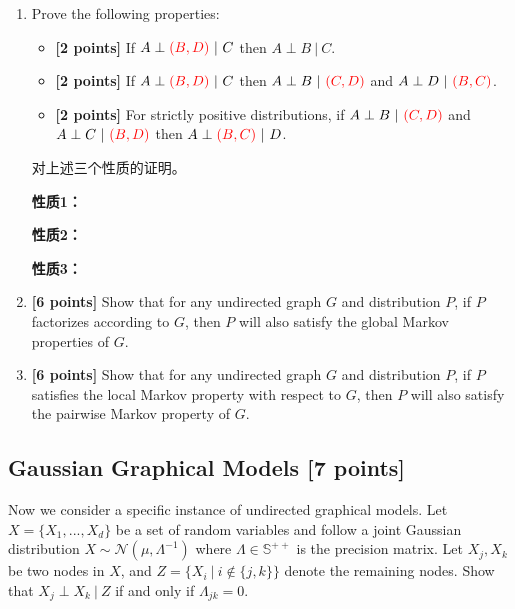 \documentclass[12pt]{article}
\begin{document}
\begin{enumerate}
	\item Prove the following properties:
	      \begin{itemize}
		      \item \textbf{[2 points]} If $A \perp {\color{red} (B,D) } \ | \ C$ then $A \perp B \ | \ C$.
		      \item \textbf{[2 points]} If $A \perp {\color{red} (B,D) } \ | \ C$ then $A \perp B \ | \ {\color{red} (C,D) }$ and $A \perp D \ | \ {\color{red} (B,C) }$.
		      \item \textbf{[2 points]} For strictly positive distributions, if $A \perp B \ | \ {\color{red} (C,D) }$ and $A \perp C \ | \ {\color{red} (B,D) }$ then $A \perp {\color{red} (B,C) } \ | \ D$.
	      \end{itemize}
	      \begin{solution}
		      对上述三个性质的证明。

		      \textbf{性质1：}

		      \textbf{性质2：}

		      \textbf{性质3：}
	      \end{solution}
	\item \textbf{[6 points]} Show that for any undirected graph $G$ and distribution $P$, if $P$ factorizes according to $G$, then $P$ will also satisfy the global Markov properties of $G$.
	\item \textbf{[6 points]} Show that for any undirected graph $G$ and distribution $P$, if $P$ satisfies the local Markov property with respect to $G$, then $P$ will also satisfy the pairwise Markov property of $G$.
\end{enumerate}



\subsection{Gaussian Graphical Models [7 points]}

Now we consider a specific instance of undirected graphical models. Let $X = \{ X_1, ..., X_d \}$ be a set of random variables and follow a joint Gaussian distribution $X \sim \mathcal{N}(\mu, \Lambda^{-1})$ where $\Lambda \in \mathbb{S}^{++}$ is the precision matrix. Let $X_j,X_k$ be two nodes in $X$, and $Z = \{X_i \ | \ i \notin \{j,k\}\}$ denote the remaining nodes. Show that $X_j \perp X_k \ | \ Z$ if and only if $\Lambda_{jk} = 0$.
\end{document}
